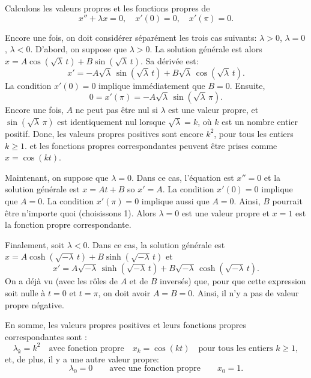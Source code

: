 \begin{example}
Calculons les valeurs propres et les fonctions propres de 
\begin{equation*}
x'' + \lambda x = 0, \quad x'(0) = 0, \quad x'(\pi) = 0 .
\end{equation*}

Encore une fois, on doit considérer séparément  les trois cas suivants: $\lambda > 0$, $\lambda = 0$, $\lambda
< 0$.
D'abord, on suppose que $\lambda > 0$.
La solution générale est alors 
$x = A \cos ( \sqrt{\lambda}\, t) + B \sin ( \sqrt{\lambda}\, t)$.  Sa dérivée est: 
\begin{equation*}
x' = -A\sqrt{\lambda}\, \sin ( \sqrt{\lambda}\, t) + B\sqrt{\lambda}\,
\cos (\sqrt{\lambda}\, t) .
\end{equation*}
La condition $x'(0) = 0$ implique immédiatement que  $B = 0$.
Ensuite,
\begin{equation*}
0 = x'(\pi) = -A\sqrt{\lambda}\, \sin ( \sqrt{\lambda}\, \pi) .
\end{equation*}
Encore une fois,  $A$ ne peut pas être nul si  $\lambda$ est une valeur propre, et $\sin ( \sqrt{\lambda}\, \pi)$ est identiquement nul lorsque
$\sqrt{\lambda} = k$,  où $k$ est un nombre entier positif.
Donc, les valeurs propres positives sont encore 
$k^2$, pour tous les entiers $k \geq 1$.  et les fonctions propres correspondantes peuvent être prises comme  $x=\cos (k t)$.

Maintenant, on suppose que  $\lambda = 0$.  Dans ce cas, l'équation est $x'' = 0$
et la solution générale est $x = At + B$ so $x' = A$.  La condition 
$x'(0) = 0$ implique que 
$A=0$.  La condition $x'(\pi) = 0$ implique aussi que  $A=0$.
Ainsi, $B$ pourrait être n'importe quoi (choisissons 1). Alors  $\lambda = 0$
est une valeur propre et $x=1$ est la fonction propre correspondante. 

Finalement, soit $\lambda < 0$.  Dans ce cas, la solution générale est 
$x = A \cosh ( \sqrt{-\lambda}\, t) + B \sinh ( \sqrt{-\lambda}\, t)$
et
\begin{equation*}
x' = A\sqrt{-\lambda}\, \sinh ( \sqrt{-\lambda}\, t)
+ B\sqrt{-\lambda}\, \cosh ( \sqrt{-\lambda}\, t ) .
\end{equation*}
On a déjà vu (avec les rôles de  $A$ et de $B$ inversés) que, pour que cette expression soit  nulle à $t=0$ et $t=\pi$, on doit avoir $A=B=0$. Ainsi, il n'y a pas de valeur propre négative. 

En somme, les valeurs propres positives et leurs fonctions propres correspondantes sont :
\begin{equation*}
\lambda_k = k^2 \quad \text{avec fonction propre} \quad x_k = \cos (k t)
\quad \text{pour tous les entiers } k \geq 1 ,
\end{equation*}
et, de plus, il y a une autre valeur propre: 
\begin{equation*}
\lambda_0 = 0 \qquad \text{avec une fonction propre} \qquad x_0 = 1.
\end{equation*}
\end{example}

